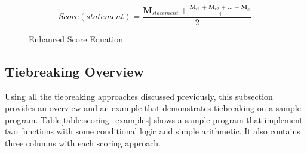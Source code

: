 \begin{figure}[!htb]
	\begin{center}
		\begin{equation}
			Score(statement) = \frac{\textbf{M$_{statement}$} + \frac{\textbf{M$_{c1}$ + M$_{c2}$ + ... + M$_{ci}$}}{\textbf{i}}}{2}
		\end{equation}
		\caption{\label{fig:enhanced_score_equation} Enhanced Score Equation}
	\end{center}
\end{figure}

\subsection{Tiebreaking Overview}
\label{subsec:tiebreak_overview}

Using all the tiebreaking approaches discussed previously, this subsection
provides an overview and an example that demonstrates tiebreaking on a sample
program. Table\ref{table:scoring_examples} shows a sample program that implement
two functions with some conditional logic and simple arithmetic. It also
contains three columns with each scoring approach.

